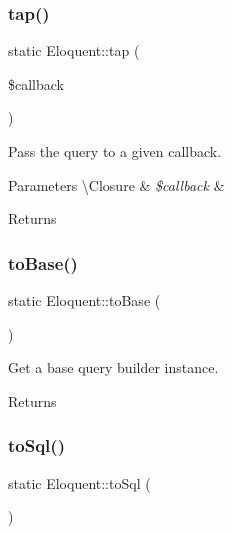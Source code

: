 \subsubsection{\texorpdfstring{tap()}{tap()}}
{\footnotesize\ttfamily static Eloquent\+::tap (\begin{DoxyParamCaption}\item[{}]{\$callback }\end{DoxyParamCaption})\hspace{0.3cm}{\ttfamily [static]}}

Pass the query to a given callback.


\begin{DoxyParams}[1]{Parameters}
\textbackslash{}\+Closure & {\em \$callback} & \\
\hline
\end{DoxyParams}
\begin{DoxyReturn}{Returns}

\end{DoxyReturn}
\mbox{\label{class_eloquent_abc76b992d3cb97247cd15d2d66c6e2d2}} 
\subsubsection{\texorpdfstring{to\+Base()}{toBase()}}
{\footnotesize\ttfamily static Eloquent\+::to\+Base (\begin{DoxyParamCaption}{ }\end{DoxyParamCaption})\hspace{0.3cm}{\ttfamily [static]}}

Get a base query builder instance.

\begin{DoxyReturn}{Returns}

\end{DoxyReturn}
\mbox{\label{class_eloquent_ac788e862f43bba3f9d0ff6a13b82774b}} 
\subsubsection{\texorpdfstring{to\+Sql()}{toSql()}}
{\footnotesize\ttfamily static Eloquent\+::to\+Sql (\begin{DoxyParamCaption}{ }\end{DoxyParamCaption})\hspace{0.3cm}{\ttfamily [static]}}


